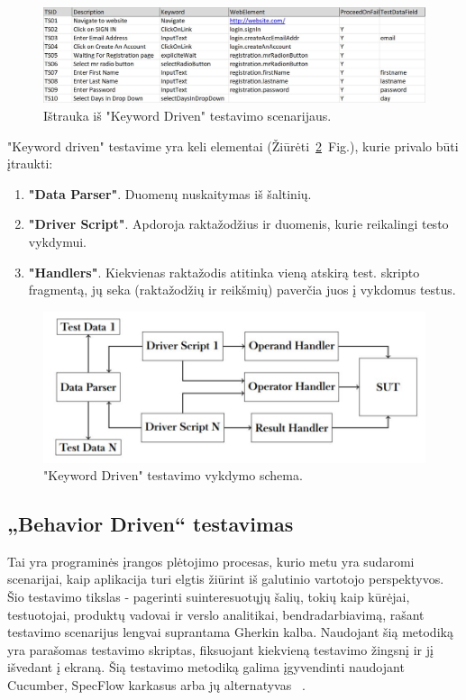\documentclass[a4paper,12pt,fleqn]{article}
\begin{document}
\begin{figure}[h]
    \centering
    \includegraphics[width=1\textwidth]{KeywordDrivenData.JPG}
    \caption{Ištrauka iš "Keyword Driven" testavimo scenarijaus.}
    \label{fig:data}
\end{figure}

"Keyword driven" testavime yra keli elementai (Žiūrėti\ \ref{fig:keyword}~Fig.), kurie privalo būti įtraukti:
\begin{enumerate}
    \item \textbf{"Data Parser"}. Duomenų nuskaitymas iš šaltinių.
    \item \textbf{"Driver Script"}. Apdoroja raktažodžius ir duomenis, kurie reikalingi testo vykdymui.
    \item \textbf{"Handlers"}. Kiekvienas raktažodis atitinka vieną atskirą test. skripto fragmentą, jų seka (raktažodžių ir reikšmių) paverčia juos į vykdomus testus.
\end{enumerate}

\begin{figure}[h]
    \centering
    \includegraphics[width=1\textwidth]{Keyword.JPG}
    \caption{"Keyword Driven" testavimo vykdymo schema.}
    \label{fig:keyword}
\end{figure}

\subsection{„Behavior Driven“ testavimas}
Tai yra programinės įrangos plėtojimo procesas, kurio metu yra sudaromi scenarijai, kaip aplikacija turi elgtis žiūrint iš galutinio vartotojo perspektyvos. Šio testavimo tikslas - pagerinti suinteresuotųjų šalių, tokių kaip kūrėjai, testuotojai, produktų vadovai ir verslo analitikai, bendradarbiavimą, rašant testavimo scenarijus lengvai suprantama Gherkin kalba. Naudojant šią metodiką yra parašomas testavimo skriptas, fiksuojant kiekvieną testavimo žingsnį ir jį išvedant į ekraną. Šią testavimo metodiką galima įgyvendinti naudojant Cucumber, SpecFlow karkasus arba jų alternatyvas ~\cite{smart2014bdd}.
\end{document}
